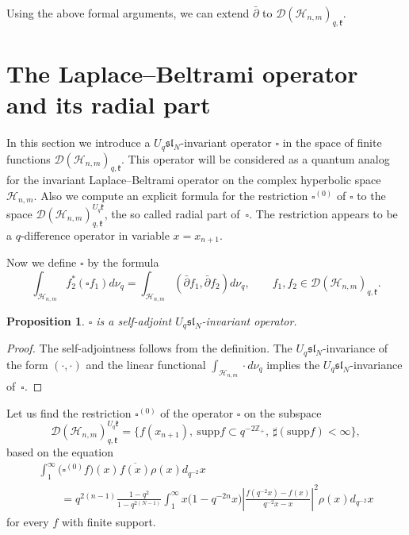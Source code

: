 \documentclass[11pt]{article}
\newtheorem{proposition}{Proposition}
\begin{document}
Using the above formal arguments, we
can extend $\bar \partial$ to
$\mathscr{D}(\mathscr{H}_{n,m})_{q,\mathfrak{k}}$.


\section[The Laplace-Beltrami operator and its radial part]{The Laplace--Beltrami operator and its radial part}\label{sec_6}

In this section we introduce a $U_q \mathfrak{sl}_N$-invariant operator $\square$ in the space of f\/inite
functions $\mathscr{D}(\mathscr{H}_{n,m})_{q, \mathfrak{k}}$. This operator will be considered as a quantum
analog for the invariant Laplace--Beltrami operator on the complex hyperbolic space $\mathscr{H}_{n,m}$. Also
we compute an explicit formula for the restriction $\square^{(0)}$ of $\square$ to the space
$\mathscr{D}(\mathscr{H}_{n,m})_{q,\mathfrak{k}}^{U_q \mathfrak{k}}$, the so called radial part of~$\square$.
The restriction appears to be a $q$-dif\/ference operator in variable $x=x_{n+1}$.

Now we def\/ine $\square$ by the formula
\[
\int_{\mathscr{H}_{n,m}}f_2^* (\square f_1) d\nu_q=\int _{\mathscr{H}_{n,m}} (\bar \partial f_1, \bar
\partial f_2) d\nu_q, \qquad f_1,f_2 \in \mathscr{D}(\mathscr{H}_{n,m})_{q,\mathfrak{k}}.
\]

\begin{proposition}
$\square$ is a self-adjoint $U_q \mathfrak{sl}_N$-invariant operator.
\end{proposition}

\begin{proof} The self-adjointness follows from the def\/inition. The $U_q \mathfrak{sl}_N$-invariance of the
form $(\cdot,\cdot)$ and the linear functional $\int_{\mathscr{H}_{n,m}} \cdot d\nu_q$ implies the $U_q
\mathfrak{sl}_N$-invariance of~$\square$.
\end{proof}



Let us f\/ind the restriction $\square^{(0)}$ of the operator $\square$ on the subspace
\[
\mathscr{D}(\mathscr{H}_{n,m})_{q,\mathfrak{k}}^{U_q \mathfrak{k}}=\big\{ f(x_{n+1}), \ \mathrm{supp} f \subset q^{-2 \mathbb{Z}_+},\
\sharp (\mathrm{supp} f) < \infty \big\},
\]
based on the equation
\begin{gather*}
\int_1^\infty \big(\square^{(0)} f\big) (x) \overline{f(x)} \rho(x) d_{q^{-2}} x \\
\qquad{} = q^{2(n-1)}
\frac{1-q^2}{1-q^{2(N-1)}} \int_1^\infty x \big(1-q^{-2n} x\big) \left| \frac{f(q^{-2}x)-f(x)}{q^{-2}x - x}
\right|^2 \rho(x) d_{q^{-2}} x
\end{gather*}
for every $f$ with f\/inite support.
\end{document}
